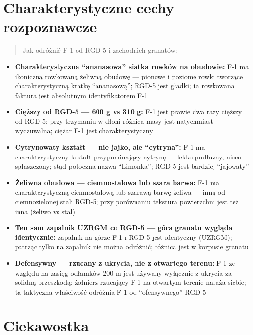 \documentclass[12pt,openany,oneside]{book}
\providecommand{\tightlist}{%
  \setlength{\itemsep}{0pt}\setlength{\parskip}{0pt}}
\begin{document}
\section{Charakterystyczne cechy
rozpoznawcze}\label{charakterystyczne-cechy-rozpoznawcze-101}

\begin{quote}
Jak odróżnić F-1 od RGD-5 i zachodnich granatów:
\end{quote}

\begin{itemize}
\tightlist
\item
  \textbf{Charakterystyczna ``ananasowa'' siatka rowków na obudowie:}
  F-1 ma ikoniczną rowkowaną żeliwną obudowę --- pionowe i poziome rowki
  tworzące charakterystyczną kratkę ``ananasową''; RGD-5 jest gładki; ta
  rowkowana faktura jest absolutnym identyfikatorem F-1
\item
  \textbf{Cięższy od RGD-5 --- 600 g vs 310 g:} F-1 jest prawie dwa razy
  cięższy od RGD-5; przy trzymaniu w dłoni różnica masy jest natychmiast
  wyczuwalna; ciężar F-1 jest charakterystyczny
\item
  \textbf{Cytrynowaty kształt --- nie jajko, ale ``cytryna'':} F-1 ma
  charakterystyczny kształt przypominający cytrynę --- lekko podłużny,
  nieco spłaszczony; stąd potoczna nazwa ``Limonka''; RGD-5 jest
  bardziej ``jajowaty''
\item
  \textbf{Żeliwna obudowa --- ciemnostalowa lub szara barwa:} F-1 ma
  charakterystyczną ciemnostalową lub szarawą barwę żeliwa --- inną od
  ciemnozielonej stali RGD-5; przy porównaniu tekstura powierzchni jest
  też inna (żeliwo vs stal)
\item
  \textbf{Ten sam zapalnik UZRGM co RGD-5 --- góra granatu wygląda
  identycznie:} zapalnik na górze F-1 i RGD-5 jest identyczny (UZRGM);
  patrząc tylko na zapalnik nie można odróżnić; różnica jest w korpusie
  granatu
\item
  \textbf{Defensywny --- rzucany z ukrycia, nie z otwartego terenu:} F-1
  ze względu na zasięg odłamków 200 m jest używany wyłącznie z ukrycia
  za solidną przeszkodą; żołnierz rzucający F-1 na otwartym terenie
  naraża siebie; ta taktyczna właściwość odróżnia F-1 od ``ofensywnego''
  RGD-5
\end{itemize}

\section{Ciekawostka}\label{ciekawostka-101}
\end{document}
